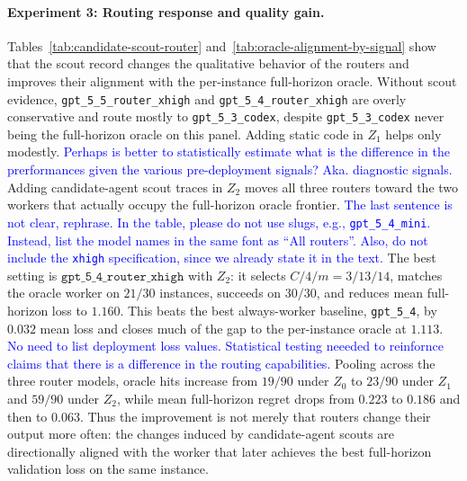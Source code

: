 \documentclass{article}
\begin{document}
\paragraph{Experiment 3: Routing response and quality gain.}
Tables~\ref{tab:candidate-scout-router} and~\ref{tab:oracle-alignment-by-signal} show that the scout record changes the qualitative behavior of the routers and improves their alignment with the per-instance full-horizon oracle.
Without scout evidence, \texttt{gpt\_5\_5\_router\_xhigh} and \texttt{gpt\_5\_4\_router\_xhigh} are overly conservative and route mostly to \texttt{gpt\_5\_3\_codex}, despite \texttt{gpt\_5\_3\_codex} never being the full-horizon oracle on this panel.
Adding static code in \(Z_1\) helps only modestly. \textcolor{blue}{Perhaps is better to statistically estimate what is the difference in the prerformances given the various pre-deployment signals? Aka. diagnostic signals.  }
Adding candidate-agent scout traces in \(Z_2\) moves all three routers toward the two workers that actually occupy the full-horizon oracle frontier. \textcolor{blue}{The last sentence is not clear, rephrase.} \textcolor{blue}{In the table, please do not use slugs, e.g., \texttt{gpt\_5\_4\_mini}. Instead, list the model names in the same font as ``All routers''. Also, do not include the \texttt{xhigh} specification, since we already state it in the text.}
The best setting is \(\texttt{gpt\_5\_4\_router\_xhigh}\) with \(Z_2\): it selects \(C/4/m=3/13/14\), matches the oracle worker on \(21/30\) instances, succeeds on \(30/30\), and reduces mean full-horizon loss to \(1.160\).
This beats the best always-worker baseline, \texttt{gpt\_5\_4}, by \(0.032\) mean loss and closes much of the gap to the per-instance oracle at \(1.113\). \textcolor{blue}{No need to list deployment loss values. Statistical testing neeeded to reinfornce claims that there is a difference in the routing capabilities.}
Pooling across the three router models, oracle hits increase from \(19/90\) under \(Z_0\) to \(23/90\) under \(Z_1\) and \(59/90\) under \(Z_2\), while mean full-horizon regret drops from \(0.223\) to \(0.186\) and then to \(0.063\).
Thus the improvement is not merely that routers change their output more often: the changes induced by candidate-agent scouts are directionally aligned with the worker that later achieves the best full-horizon validation loss on the same instance.
\end{document}
